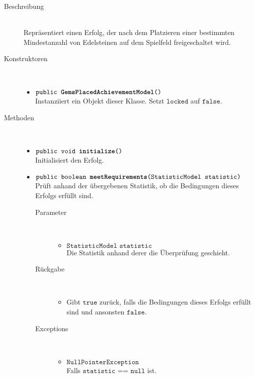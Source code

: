 		\begin{description}
		\item[Beschreibung] \hfill \\ Repräsentiert einen Erfolg, der nach dem Platzieren einer bestimmten Mindestanzahl von Edelsteinen auf dem Spielfeld freigeschaltet wird.
			
		\item[Konstruktoren] \hfill \\
			\vspace{-.8cm}
			\begin{itemize}
				\item $\texttt{public \textbf{GemsPlacedAchievementModel}()}$ \\ Instanziiert ein Objekt dieser Klasse. Setzt $\texttt{locked}$ auf $\texttt{false}$.
			\end{itemize}
			
		\item[Methoden] \hfill \\
			\vspace{-.8cm}
			\begin{itemize}
						\item $\texttt{public void \textbf{initialize}()}$ \\ Initialisiert den Erfolg.
				
				\item $\texttt{public boolean \textbf{meetRequirements}(StatisticModel statistic)}$ \\ Prüft anhand der übergebenen Statistik, ob die Bedingungen dieses Erfolgs erfüllt sind.
				\begin{description}
				\item[Parameter] \hfill \\
					\vspace{-.8cm}
					\begin{itemize}
						\item $\texttt{StatisticModel statistic}$ \\ Die Statistik anhand derer die Überprüfung geschieht. 
					\end{itemize}
					\item[Rückgabe] \hfill \\
					\vspace{-.8cm}
					\begin{itemize}
						\item Gibt $\texttt{true}$ zurück, falls die Bedingungen dieses Erfolgs erfüllt sind und ansonsten $\texttt{false}$.
					\end{itemize}
					\item[Exceptions] \hfill \\
					\vspace{-.8cm}
					\begin{itemize}
						\item $\texttt{NullPointerException}$ \\ Falls $\texttt{statistic == null}$ ist.
					\end{itemize}
				\end{description}
				
			\end{itemize}
		\end{description}
		
